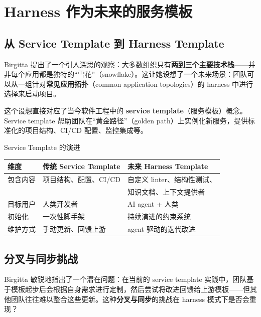 \section{Harness 作为未来的服务模板}

\subsection{从 Service Template 到 Harness Template}

Birgitta 提出了一个引人深思的观察：大多数组织只有\textbf{两到三个主要技术栈}------并非每个应用都是独特的``雪花''（snowflake）。这让她设想了一个未来场景：团队可以从一组针对\textbf{常见应用拓扑}（common application topologies）的 harness 中进行选择来启动项目。

这个设想直接对应了当今软件工程中的 \textbf{service template}（服务模板）概念。Service template 帮助团队在``黄金路径''（golden path）上实例化新服务，提供标准化的项目结构、CI/CD 配置、监控集成等。

\begin{knowledgebox}{Service Template 的演进}
\begin{table}[H]
\centering
\begin{tabular}{lll}
\toprule
\textbf{维度} & \textbf{传统 Service Template} & \textbf{未来 Harness Template} \\
\midrule
包含内容 & 项目结构、配置、CI/CD & 自定义 linter、结构性测试、 \\
 & & 知识文档、上下文提供者 \\
目标用户 & 人类开发者 & AI agent + 人类 \\
初始化 & 一次性脚手架 & 持续演进的约束系统 \\
维护方式 & 手动更新、回馈上游 & agent 驱动的迭代改进 \\
\bottomrule
\end{tabular}
\end{table}
\end{knowledgebox}

\subsection{分叉与同步挑战}

Birgitta 敏锐地指出了一个潜在问题：在当前的 service template 实践中，团队基于模板起步后会根据自身需求进行定制，然后尝试将改进回馈给上游模板------但其他团队往往难以整合这些更新。这种\textbf{分叉与同步}的挑战在 harness 模式下是否会重现？

